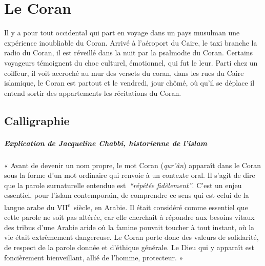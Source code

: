 
\chapter{Le Coran}



Il y a pour tout occidental qui part en voyage dans un pays musulman une
expérience inoubliable du Coran. Arrivé à l'aéroport du Caire, le taxi
branche la radio du Coran, il est réveillé dans la nuit par la psalmodie
du Coran. Certains voyageurs témoignent du choc culturel, émotionnel,
qui fut le leur. Parti chez un coiffeur, il voit accroché au mur des
versets du coran, dans les rues du Caire islamique, le Coran est partout
et le vendredi, jour chômé, où qu'il se déplace il entend sortir des
appartements les récitations du Coran.


\section{Calligraphie}
\paragraph{
Explication de Jacqueline
Chabbi, historienne de
l'islam}
\begin{cite}
« Avant de devenir un nom propre, le mot Coran (\emph{qur'ân}) apparaît
dans le Coran sous la forme d'un mot ordinaire qui renvoie à un contexte
oral. Il s'agit de dire que la parole surnaturelle entendue
est\emph{~``répétée fidèlement''}. C'est un enjeu essentiel, pour
l'islam contemporain, de comprendre ce sens qui est celui de la langue
arabe du VII\textsuperscript{e}~siècle, en Arabie. Il était considéré
comme essentiel que cette parole ne soit pas altérée, car elle cherchait
à répondre aux besoins vitaux des tribus d'une Arabie aride où la famine
pouvait toucher à tout instant, où la vie était extrêmement dangereuse.
Le Coran porte donc des valeurs de solidarité, de respect de la parole
donnée et d'éthique générale. Le Dieu qui y apparaît est foncièrement
bienveillant, allié de l'homme, protecteur. »
\end{cite}
 \\

